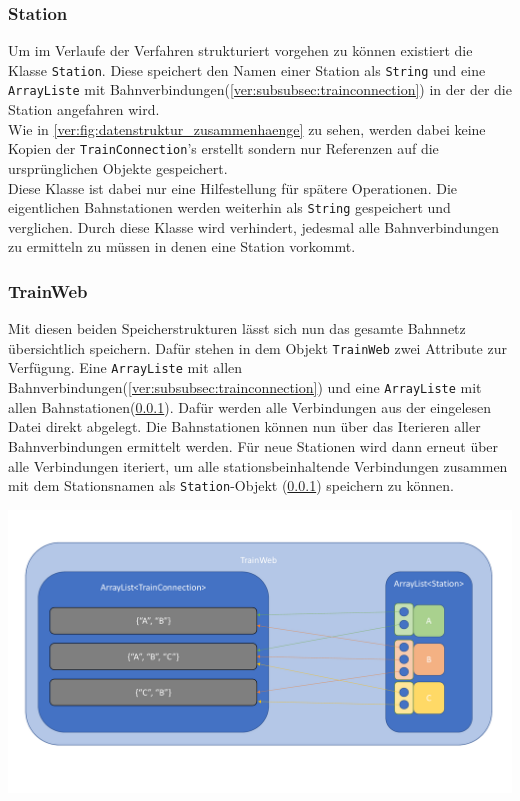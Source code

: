 \subsubsection{Station}\label{ver:subsubsec:station}
Um im Verlaufe der Verfahren strukturiert vorgehen zu können existiert die Klasse \texttt{Station}. Diese speichert den Namen einer Station als \texttt{String} und eine \texttt{ArrayListe} mit Bahnverbindungen(\ref{ver:subsubsec:trainconnection}) in der der die Station angefahren wird.\\
Wie in \ref{ver:fig:datenstruktur_zusammenhaenge} zu sehen, werden dabei keine Kopien der \texttt{TrainConnection}'s erstellt sondern nur Referenzen auf die ursprünglichen Objekte gespeichert.\\
Diese Klasse ist dabei nur eine Hilfestellung für spätere Operationen. Die eigentlichen Bahnstationen werden weiterhin als \texttt{String} gespeichert und verglichen. Durch diese Klasse wird verhindert, jedesmal alle Bahnverbindungen zu ermitteln zu müssen in denen eine Station vorkommt.\\

\subsubsection{TrainWeb}\label{ver:subsubsec:trainweb}
Mit diesen beiden Speicherstrukturen lässt sich nun das gesamte Bahnnetz übersichtlich speichern. Dafür stehen in dem Objekt \texttt{TrainWeb} zwei Attribute zur Verfügung. Eine \texttt{ArrayListe} mit allen Bahnverbindungen(\ref{ver:subsubsec:trainconnection}) und eine \texttt{ArrayListe} mit allen Bahnstationen(\ref{ver:subsubsec:station}).
Dafür werden alle Verbindungen aus der eingelesen Datei direkt abgelegt. Die Bahnstationen können nun über das Iterieren aller Bahnverbindungen ermittelt werden. Für neue Stationen wird dann erneut über alle Verbindungen iteriert, um alle stationsbeinhaltende Verbindungen zusammen mit dem Stationsnamen als \texttt{Station}-Objekt (\ref{ver:subsubsec:station}) speichern zu können.\\

\begin{center}
    \includegraphics[width=\linewidth]{images/Datenstruktur_Zusammenhaenge.pdf}
    \label{ver:fig:datenstruktur_zusammenhaenge}
\end{center}


